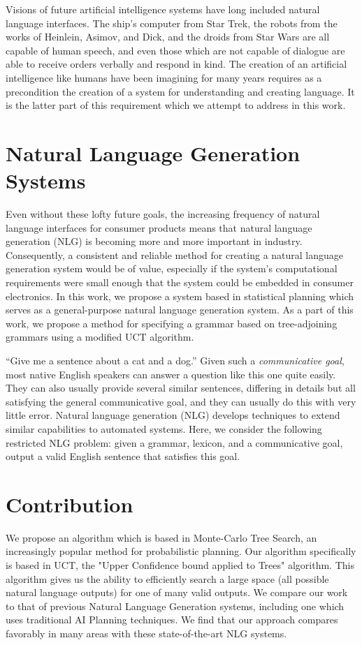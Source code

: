 Visions of future artificial intelligence systems have long included natural
language interfaces.  The ship's computer from Star Trek, the robots from
the works of Heinlein, Asimov, and Dick, and the droids from Star Wars are
all capable of human speech, and even those which are not capable of dialogue
are able to receive orders verbally and respond in kind.  The creation
of an artificial intelligence like humans have been imagining for many years
requires as a precondition the creation of a system for understanding and
creating language.  It is the latter part of this requirement which we attempt to 
address in this work.

\section{Natural Language Generation Systems}
Even without these lofty future goals, the increasing frequency of natural language interfaces for consumer
products means that natural language generation (NLG) is becoming more and more important
in industry.  Consequently, a consistent and reliable method for creating a natural
language generation system would be of value, especially if the system's
computational requirements were small enough that the system could be embedded
in consumer electronics.  In this work, we propose a system based in statistical
planning which serves as a general-purpose natural language generation system.
As a part of this work, we propose a method for specifying a grammar based on
tree-adjoining grammars using a modified UCT algorithm.

``Give me a sentence about a cat and a dog.'' Given such a {\em
communicative goal}, most native English speakers
can answer a question like this one quite easily.
They can also usually provide several similar sentences,
differing in details but all satisfying the general communicative goal,
and they can usually do this with very little error. Natural language generation (NLG) develops
techniques to extend similar capabilities to automated systems. 
Here, we consider the following restricted NLG problem: given a
grammar, lexicon, and a communicative goal, output a valid English
sentence that satisfies this goal.

\section{Contribution}
We propose an algorithm which is based in Monte-Carlo Tree Search, an increasingly
popular method for probabilistic planning.  Our algorithm specifically is based in
UCT, the "Upper Confidence bound applied to Trees" algorithm.  This algorithm gives
us the ability to efficiently search a large space (all possible natural language outputs) for 
one of many valid outputs.  We compare our work to that of previous Natural Language
Generation systems, including one which uses traditional AI Planning techniques.
We find that our approach compares favorably in many areas with these state-of-the-art
NLG systems.